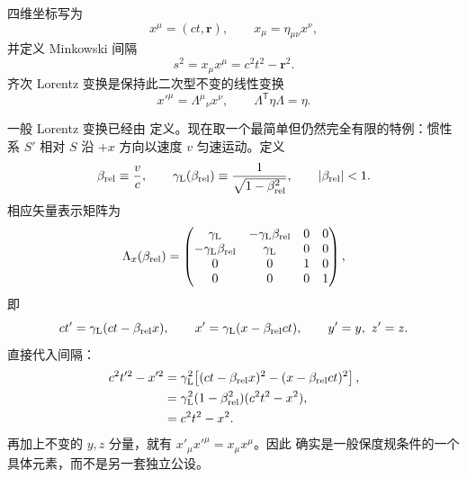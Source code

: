 四维坐标写为
\begin{equation*}
 x^\mu=(ct,\mathbf r),\qquad x_\mu=\eta_{\mu\nu}x^\nu,
\end{equation*}
并定义 Minkowski 间隔
\begin{equation*}
 s^2=x_\mu x^\mu=c^2t^2-\mathbf r^2.
\end{equation*}
齐次 Lorentz 变换是保持此二次型不变的线性变换
\begin{equation}
 x'^\mu=\Lambda^\mu{}_{\nu}x^\nu,
 \qquad
 \Lambda^{\mathsf T}\eta\Lambda=\eta.
 \label{eq:lorentz-metric}
\end{equation}
\begin{exbox}[沿 $x$ 轴的有限推动]
一般 Lorentz 变换已经由 定义。现在取一个最简单但仍然完全有限的特例：惯性系 $S'$ 相对 $S$ 沿 $+x$ 方向以速度 $v$ 匀速运动。定义
\begin{equation*}
 \beta_{\rm rel}\equiv\frac{v}{c},
 \qquad
 \gamma_{\rm L}(\beta_{\rm rel})\equiv\frac1{\sqrt{1-\beta_{\rm rel}^2}},
 \qquad |\beta_{\rm rel}|<1.
\end{equation*}
相应矢量表示矩阵为
\begin{equation}
 \Lambda_x(\beta_{\rm rel})=
 \begin{pmatrix}
 \gamma_{\rm L} &-\gamma_{\rm L}\beta_{\rm rel}&0&0\\
 -\gamma_{\rm L}\beta_{\rm rel}&\gamma_{\rm L}&0&0\\
 0&0&1&0\\
 0&0&0&1
 \end{pmatrix},
 \label{eq:x-boost-matrix-dp61}
\end{equation}
即
\begin{equation*}
 ct'=\gamma_{\rm L}(ct-\beta_{\rm rel}x),
 \qquad
 x'=\gamma_{\rm L}(x-\beta_{\rm rel}ct),
 \qquad y'=y,\ z'=z.
\end{equation*}
直接代入间隔：
\begin{align*}
 c^2t'^2-x'^2
 &=\gamma_{\rm L}^2\!
 \left[(ct-\beta_{\rm rel}x)^2
 -(x-\beta_{\rm rel}ct)^2\right],\\
 &=\gamma_{\rm L}^2(1-\beta_{\rm rel}^2)(c^2t^2-x^2),\\
 &=c^2t^2-x^2.
\end{align*}
再加上不变的 $y,z$ 分量，就有 $x'_\mu x'^\mu=x_\mu x^\mu$。因此 确实是一般保度规条件的一个具体元素，而不是另一套独立公设。


\end{exbox}
